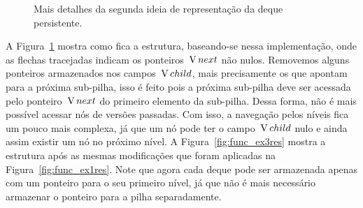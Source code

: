 \documentclass[../../main.tex]{subfiles}
\begin{document}
\begin{figure}[h]
\centering
{}
\caption{Mais detalhes da segunda ideia de representação da deque persistente.} \label{fig:func_ex3}
\end{figure}


A Figura~\ref{fig:func_ex3} mostra como fica a estrutura, baseando-se nessa implementação, onde as flechas tracejadas indicam os ponteiros~$\operatorname{V}{next}$ não nulos. Removemos alguns ponteiros armazenados nos campos~$\operatorname{V}{child}$, mais precisamente os que apontam para a próxima sub-pilha, isso é feito pois a próxima sub-pilha deve ser acessada pelo ponteiro~$\operatorname{V}{next}$ do primeiro elemento da sub-pilha. Dessa forma, não é mais possível acessar nós de versões passadas. Com isso, a navegação pelos níveis fica um pouco mais complexa, já que um nó pode ter o campo~$\operatorname{V}{child}$ nulo e ainda assim existir um nó no próximo nível. A Figura~\ref{fig:func_ex3res} mostra a estrutura após as mesmas modificações que foram aplicadas na Figura~\ref{fig:func_ex1res}. Note que agora cada deque pode ser armazenada apenas com um ponteiro para o seu primeiro nível, já que não é mais necessário armazenar o ponteiro para a pilha separadamente.
\end{document}
